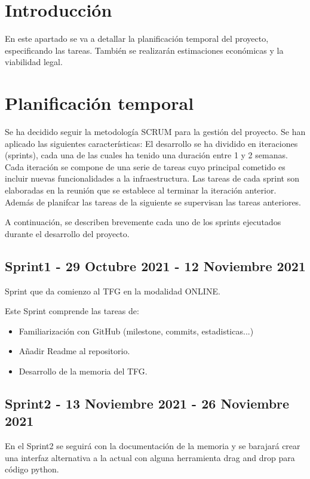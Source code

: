 
\section{Introducción}
En este apartado se va a detallar la planificación temporal del proyecto,
especificando las tareas. También se realizarán estimaciones económicas y la
viabilidad legal.
\section{Planificación temporal}

Se ha decidido seguir la metodología SCRUM para la gestión del proyecto.
Se han aplicado las siguientes características:
El desarrollo se ha dividido en iteraciones (sprints), cada una de las cuales ha tenido una duración entre 1 y 2 semanas. Cada iteración se compone de una serie de tareas cuyo principal cometido es incluir nuevas funcionalidades a la infraestructura.
Las tareas de cada sprint son elaboradas en la reunión que se establece al terminar la iteración anterior. Además de planifcar las tareas de la siguiente se supervisan las tareas anteriores.

A continuación, se describen brevemente cada uno de los sprints ejecutados durante el desarrollo del proyecto.

\subsection{Sprint1 - 29 Octubre 2021 - 12 Noviembre 2021}

Sprint que da comienzo al TFG en la modalidad ONLINE. 

Este Sprint comprende las tareas de:
\begin{itemize}
\item Familiarización con GitHub (milestone, commits, estadisticas...)
\item Añadir Readme al repositorio.
\item Desarrollo de la memoria del TFG.
\end{itemize}

\subsection{Sprint2 - 13 Noviembre 2021 - 26 Noviembre 2021}

En el Sprint2 se seguirá con la documentación de la memoria y se barajará crear una interfaz alternativa a la actual con alguna herramienta drag and drop para código python.

